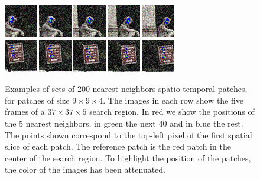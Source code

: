 \documentclass[10pt, journal, twocolumn, final, a4paper]{IEEEtran}
\begin{document}
\begin{figure}[htpb!]
	\centering
	\includegraphics[width = .8\textwidth]{figs/patch_groups/patch_group_bus_045_085_012_s40_wx37_wt2_sx9_st4_r040_n200_coor.png}\\
	\vspace{.2cm}
	\includegraphics[width = .8\textwidth]{figs/patch_groups/patch_group_bus_255_056_010_s40_wx37_wt2_sx9_st4_r040_n200_coor.png}
	\caption{Examples of sets of 200 nearest neighbors spatio-temporal patches,
	for patches of size $9\times 9\times 4$.
	The images in each row show the five frames of a $37\times37\times5$ search region. 
	In red we show the positions of the 5 nearest neighbors, in green the next 40 and in blue the rest.
	The points shown correspond to the top-left pixel of the first spatial
	slice of each patch.
	The reference patch is the red patch in the center of the search region. To highlight the
	position of the patches, the color of the images has been attenuated.}
	\label{fig:patch_groups_pos}
\end{figure}
\end{document}
